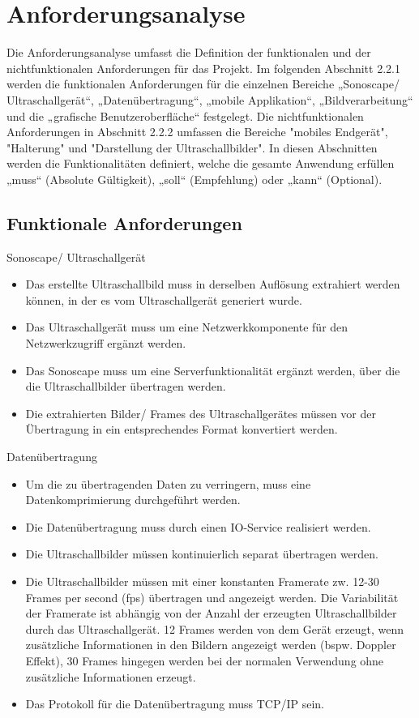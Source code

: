 \section{Anforderungsanalyse}  \label{AnfAnalyse}
Die Anforderungsanalyse umfasst die Definition der funktionalen und der nichtfunktionalen Anforderungen für das Projekt. Im folgenden Abschnitt 2.2.1 werden die funktionalen Anforderungen für die einzelnen Bereiche „Sonoscape/ Ultraschallgerät“, „Datenübertragung“, „mobile Applikation“, „Bildverarbeitung“ und die „grafische Benutzeroberfläche“ festgelegt. Die nichtfunktionalen Anforderungen in Abschnitt 2.2.2 umfassen die Bereiche "mobiles Endgerät", "Halterung" und "Darstellung der Ultraschallbilder". In diesen Abschnitten werden die  Funktionalitäten definiert, welche die gesamte Anwendung erfüllen „muss“ (Absolute Gültigkeit), „soll“ (Empfehlung) oder „kann“ (Optional).   
\subsection{Funktionale Anforderungen} \label{FunkAnf}
\begin{minipage}{\textwidth}
Sonoscape/ Ultraschallgerät
\begin{itemize}
\item Das erstellte Ultraschallbild muss in derselben Auflösung extrahiert werden können, in der es vom Ultraschallgerät generiert wurde.
\item Das Ultraschallgerät muss um eine Netzwerkkomponente für den Netzwerkzugriff ergänzt werden.
\item Das Sonoscape muss um eine Serverfunktionalität ergänzt werden, über die die Ultraschallbilder übertragen werden.
\item Die extrahierten Bilder/ Frames des Ultraschallgerätes müssen vor der Übertragung in ein entsprechendes Format konvertiert werden.
\end{itemize}
\end{minipage}

\begin{minipage}{\textwidth}
Datenübertragung
\begin{itemize}
\item Um die zu übertragenden Daten zu verringern, muss eine Datenkomprimierung durchgeführt werden. 
\item Die Datenübertragung muss durch einen IO-Service realisiert werden.
\item Die Ultraschallbilder müssen kontinuierlich separat übertragen werden.
\item Die Ultraschallbilder müssen mit einer konstanten Framerate zw. 12-30 Frames per second (fps) übertragen und angezeigt werden. Die Variabilität der Framerate ist abhängig von der Anzahl der erzeugten Ultraschallbilder durch das Ultraschallgerät. 12 Frames werden von dem Gerät erzeugt, wenn zusätzliche Informationen in den Bildern angezeigt werden (bspw. Doppler Effekt), 30 Frames hingegen werden bei der normalen Verwendung ohne zusätzliche Informationen erzeugt.
\item Das Protokoll für die Datenübertragung muss TCP/IP sein.
\end{itemize}
\end{minipage}

